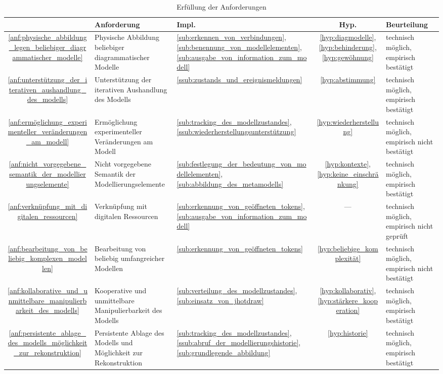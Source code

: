 \begin{table}[htbp]
	\centering
	\caption{Erfüllung der Anforderungen}
\begin{tabular}{| c | p{5cm} | p{1cm} | c | p{4cm} |} 
  \hline
  & Anforderung & Impl. & Hyp. & Beurteilung \\ \hline \hline
  \ref{anf:physische_abbildung_legen_beliebiger_diagrammatischer_modelle} & Physische Abbildung beliebiger diagrammatischer Modelle &  \ref{sub:erkennen_von_verbindungen}, \ref{sub:benennung_von_modellelementen}, \ref{sub:ausgabe_von_information_zum_modell} & \ref{hyp:diagmodelle}, \ref{hyp:behinderung}, \ref{hyp:gewöhnung} & technisch möglich, empirisch bestätigt \\ \hline
  \ref{anf:unterstützung_der_iterativen_aushandlung_des_modells} & Unterstützung der iterativen Aushandlung des Modells & \ref{ssub:zustands_und_ereignismeldungen} & \ref{hyp:abstimmung} & technisch möglich, empirisch bestätigt \\ \hline
  \ref{anf:ermöglichung_experimenteller_veränderungen_am_modell} & Ermöglichung experimenteller Veränderungen am Modell & \ref{sub:tracking_des_modellzustandes}, \ref{ssub:wiederherstellungsunterstützung} & \ref{hyp:wiederherstellung} & technisch möglich, empirisch nicht bestätigt \\ \hline \hline
  \ref{anf:nicht_vorgegebene_semantik_der_modellierungselemente} & Nicht vorgegebene Semantik der Modellierungselemente & \ref{sub:festlegung_der_bedeutung_von_modellelementen}, \ref{sub:abbildung_des_metamodells} & \ref{hyp:kontexte}, \ref{hyp:keine_einschränkung} & technisch möglich, empirisch bestätigt \\ \hline
  \ref{anf:verknüpfung_mit_digitalen_ressourcen} & Verknüpfung mit digitalen Ressourcen & \ref{sub:erkennung_von_geöffneten_tokens}, \ref{sub:ausgabe_von_information_zum_modell} & --- & technisch möglich, empirisch nicht geprüft \\ \hline
  \ref{anf:bearbeitung_von_beliebig_komplexen_modellen} & Bearbeitung von beliebig umfangreicher Modellen & \ref{sub:erkennung_von_geöffneten_tokens} & \ref{hyp:beliebige_komplexität} & technisch möglich, empirisch nicht bestätigt \\ \hline \hline
  \ref{anf:kollaborative_und_unmittelbare_manipulierbarkeit_des_modells} & Kooperative und unmittelbare Manipulierbarkeit des Modells & \ref{sub:verteilung_des_modellzustandes}, \ref{sub:einsatz_von_jhotdraw} & \ref{hyp:kollaborativ}, \ref{hyp:stärkere_kooperation} & technisch möglich, empirisch bestätigt \\ \hline
  \ref{anf:persistente_ablage_des_modells_möglichkeit_zur_rekonstruktion} & Persistente Ablage des Modells und Möglichkeit zur Rekonstruktion & \ref{sub:tracking_des_modellzustandes}, \ref{ssub:abruf_der_modellierungshistorie}, \ref{sub:grundlegende_abbildung} & \ref{hyp:historie} & technisch möglich, empirisch bestätigt \\ \hline 
\end{tabular}
	\label{tab:erfuellung_der_anforderungen}
\end{table}


